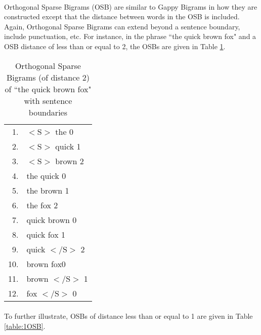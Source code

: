 		\paragraph{} Orthogonal Sparse Bigrams (OSB) are similar to Gappy Bigrams in how they are constructed except that the distance between words in the OSB is included. Again, Orthogonal Sparse Bigrams can extend beyond a sentence boundary, include punctuation, etc. For instance, in the phrase ``the quick brown fox" and a OSB distance of less than or equal to 2, the OSBs are given in Table \ref{table:2OSB}.
		\begin{center}
			\begin{table}[h]
				\begin{center}
					\begin{tabular}{ r l }
					1.  & $<\text{S}>$ the 0\\
					2.  & $<\text{S}>$ quick 1\\
					3.  & $<\text{S}>$ brown 2\\
					4.  & the quick 0\\
					5.  & the brown 1\\
					6.  & the fox 2\\
					7.  & quick brown 0\\
					8.  & quick fox 1\\
					9.  & quick $<\text{/S}>$ 2\\
					10. & brown fox0\\
					11. & brown $<\text{/S}>$ 1\\
					12. & fox $<\text{/S}>$ 0\\
					\end{tabular}
					\caption{Orthogonal Sparse Bigrams (of distance 2) of ``the quick brown fox" with sentence boundaries}
					\label{table:2OSB}
				\end{center}
			\end{table}
		\end{center}
		
		\paragraph{}To further illustrate, OSBs of distance less than or equal to 1 are given in Table \ref{table:1OSB}.
		
